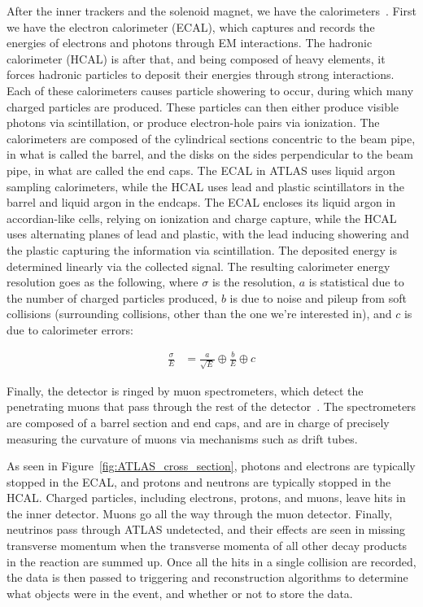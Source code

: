 After the inner trackers and the solenoid magnet, we have the calorimeters~\cite{calorimeters_intro}. First we have the electron calorimeter (ECAL), which captures and records the energies of electrons and photons through EM interactions. The hadronic calorimeter (HCAL) is after that, and being composed of heavy elements, it forces hadronic particles to deposit their energies through strong interactions. Each of these calorimeters causes particle showering to occur, during which many charged particles are produced. These particles can then either produce visible photons via scintillation, or produce electron-hole pairs via ionization. The calorimeters are composed of the cylindrical sections concentric to the beam pipe, in what is called the barrel, and the disks on the sides perpendicular to the beam pipe, in what are called the end caps. The ECAL in ATLAS uses liquid argon sampling calorimeters, while the HCAL uses lead and plastic scintillators in the barrel and liquid argon in the endcaps. The ECAL encloses its liquid argon in accordian-like cells, relying on ionization and charge capture, while the HCAL uses alternating planes of lead and plastic, with the lead inducing showering and the plastic capturing the information via scintillation. The deposited energy is determined linearly via the collected signal. The resulting calorimeter energy resolution goes as the following, where $\sigma$ is the resolution, $a$ is statistical due to the number of charged particles produced, $b$ is due to noise and pileup from soft collisions (surrounding collisions, other than the one we're interested in), and $c$ is due to calorimeter errors:

\begin{align}
    \frac{\sigma}{E} &= \frac{a}{\sqrt{E}} \oplus \frac{b}{E} \oplus c
\end{align}

Finally, the detector is ringed by muon spectrometers, which detect the penetrating muons that pass through the rest of the detector~\cite{ATLAS_TDR}. The spectrometers are composed of a barrel section and end caps, and are in charge of precisely measuring the curvature of muons via mechanisms such as drift tubes.

As seen in Figure~\ref{fig:ATLAS_cross_section}, photons and electrons are typically stopped in the ECAL, and protons and neutrons are typically stopped in the HCAL. Charged particles, including electrons, protons, and muons, leave hits in the inner detector. Muons go all the way through the muon detector. Finally, neutrinos pass through ATLAS undetected, and their effects are seen in missing transverse momentum when the transverse momenta of all other decay products in the reaction are summed up. Once all the hits in a single collision are recorded, the data is then passed to triggering and reconstruction algorithms to determine what objects were in the event, and whether or not to store the data.

